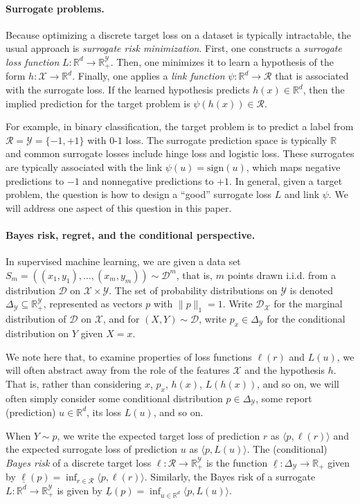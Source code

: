 \documentclass{article}
\newcommand{\reals}{\mathbb{R}}
\newcommand{\simplex}{\Delta_\Y}
\newcommand{\D}{\mathcal{D}}
\newcommand{\R}{\mathcal{R}}
\newcommand{\X}{\mathcal{X}}
\newcommand{\Y}{\mathcal{Y}}
\newcommand{\risk}[1]{\underline{#1}}
\newcommand{\inprod}[2]{\langle #1, #2 \rangle}%
\begin{document}
\paragraph{Surrogate problems.}
Because optimizing a discrete target loss on a dataset is typically intractable, the usual approach is \emph{surrogate risk minimization}.
First, one constructs a \emph{surrogate loss function} $L:\reals^d\to\reals^\Y_+$.
Then, one minimizes it to learn a hypothesis of the form $h: \X \to \reals^d$.
Finally, one applies a \emph{link function} $\psi: \reals^d \to \R$ that is associated with the surrogate loss.
If the learned hypothesis predicts $h(x) \in \reals^d$, then the implied prediction for the target problem is $\psi(h(x)) \in \R$.

For example, in binary classification, the target problem is to predict a label from $\R = \Y = \{-1,+1\}$ with $0$-$1$ loss.
The surrogate prediction space is typically $\reals$ and common surrogate losses include hinge loss and logistic loss.
These surrogates are typically associated with the link $\psi(u) = \mathrm{sign}(u)$, which maps negative predictions to $-1$ and nonnegative predictions to $+1$.
In general, given a target problem, the question is how to design a ``good'' surrogate loss $L$ and link $\psi$.
We will address one aspect of this question in this paper.

\paragraph{Bayes risk, regret, and the conditional perspective.}
In supervised machine learning, we are given a data set $S_m = ((x_1,y_1), \dots, (x_m,y_m)) \sim \D^m$, that is, $m$ points drawn i.i.d. from a distribution $\D$ on $\X \times \Y$.
The set of probability distributions on $\Y$ is denoted $\simplex\subseteq\reals^{\Y}_+$, represented as vectors $p$ with $\|p\|_1 = 1$.
Write $\D_{\X}$ for the marginal distribution of $\D$ on $\X$, and for $(X,Y) \sim \D$, write $p_x \in \simplex$ for the conditional distribution on $Y$ given $X=x$.

We note here that, to examine properties of loss functions $\ell(r)$ and $L(u)$, we will often abstract away from the role of the features $\X$ and the hypothesis $h$.
That is, rather than considering $x$, $p_x$, $h(x)$, $L(h(x))$, and so on, we will often simply consider some conditional distribution $p \in \simplex$, some report (prediction) $u \in \reals^d$, its loss $L(u)$, and so on.

When $Y \sim p$, we write the expected target loss of prediction $r$ as $\inprod{p}{\ell(r)}$ and the expected surrogate loss of prediction $u$ as $\inprod{p}{L(u)}$.
The (conditional) \emph{Bayes risk} of a discrete target loss $\ell: \R \to \reals^{\Y}_+$ is the function $\risk{\ell}: \simplex \to \reals_+$ given by $\risk{\ell}(p) = \inf_{r \in \R} \inprod{p}{\ell(r)}$.
Similarly, the Bayes risk of a surrogate $L: \reals^d \to \reals^{\Y}_+$ is given by $\risk{L}(p) = \inf_{u\in\reals^d} \inprod{p}{L(u)}$.
\end{document}
